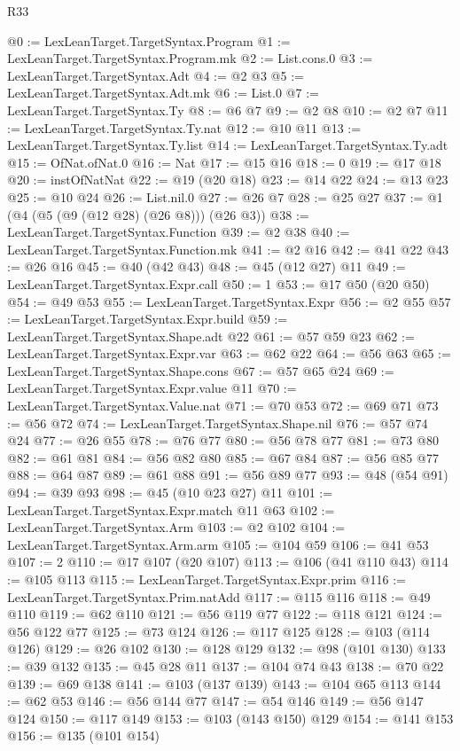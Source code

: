 \begin{lexlean}{R33}
\begin{coremodule}
@0 := LexLeanTarget.TargetSyntax.Program
@1 := LexLeanTarget.TargetSyntax.Program.mk
@2 := List.cons.{0}
@3 := LexLeanTarget.TargetSyntax.Adt
@4 := @2 @3
@5 := LexLeanTarget.TargetSyntax.Adt.mk
@6 := List.{0}
@7 := LexLeanTarget.TargetSyntax.Ty
@8 := @6 @7
@9 := @2 @8
@10 := @2 @7
@11 := LexLeanTarget.TargetSyntax.Ty.nat
@12 := @10 @11
@13 := LexLeanTarget.TargetSyntax.Ty.list
@14 := LexLeanTarget.TargetSyntax.Ty.adt
@15 := OfNat.ofNat.{0}
@16 := Nat
@17 := @15 @16
@18 := 0
@19 := @17 @18
@20 := instOfNatNat
@22 := @19 (@20 @18)
@23 := @14 @22
@24 := @13 @23
@25 := @10 @24
@26 := List.nil.{0}
@27 := @26 @7
@28 := @25 @27
@37 := @1 (@4 (@5 (@9 (@12 @28) (@26 @8))) (@26 @3))
@38 := LexLeanTarget.TargetSyntax.Function
@39 := @2 @38
@40 := LexLeanTarget.TargetSyntax.Function.mk
@41 := @2 @16
@42 := @41 @22
@43 := @26 @16
@45 := @40 (@42 @43)
@48 := @45 (@12 @27) @11
@49 := LexLeanTarget.TargetSyntax.Expr.call
@50 := 1
@53 := @17 @50 (@20 @50)
@54 := @49 @53
@55 := LexLeanTarget.TargetSyntax.Expr
@56 := @2 @55
@57 := LexLeanTarget.TargetSyntax.Expr.build
@59 := LexLeanTarget.TargetSyntax.Shape.adt @22
@61 := @57 @59 @23
@62 := LexLeanTarget.TargetSyntax.Expr.var
@63 := @62 @22
@64 := @56 @63
@65 := LexLeanTarget.TargetSyntax.Shape.cons
@67 := @57 @65 @24
@69 := LexLeanTarget.TargetSyntax.Expr.value @11
@70 := LexLeanTarget.TargetSyntax.Value.nat
@71 := @70 @53
@72 := @69 @71
@73 := @56 @72
@74 := LexLeanTarget.TargetSyntax.Shape.nil
@76 := @57 @74 @24
@77 := @26 @55
@78 := @76 @77
@80 := @56 @78 @77
@81 := @73 @80
@82 := @61 @81
@84 := @56 @82 @80
@85 := @67 @84
@87 := @56 @85 @77
@88 := @64 @87
@89 := @61 @88
@91 := @56 @89 @77
@93 := @48 (@54 @91)
@94 := @39 @93
@98 := @45 (@10 @23 @27) @11
@101 := LexLeanTarget.TargetSyntax.Expr.match @11 @63
@102 := LexLeanTarget.TargetSyntax.Arm
@103 := @2 @102
@104 := LexLeanTarget.TargetSyntax.Arm.arm
@105 := @104 @59
@106 := @41 @53
@107 := 2
@110 := @17 @107 (@20 @107)
@113 := @106 (@41 @110 @43)
@114 := @105 @113
@115 := LexLeanTarget.TargetSyntax.Expr.prim
@116 := LexLeanTarget.TargetSyntax.Prim.natAdd
@117 := @115 @116
@118 := @49 @110
@119 := @62 @110
@121 := @56 @119 @77
@122 := @118 @121
@124 := @56 @122 @77
@125 := @73 @124
@126 := @117 @125
@128 := @103 (@114 @126)
@129 := @26 @102
@130 := @128 @129
@132 := @98 (@101 @130)
@133 := @39 @132
@135 := @45 @28 @11
@137 := @104 @74 @43
@138 := @70 @22
@139 := @69 @138
@141 := @103 (@137 @139)
@143 := @104 @65 @113
@144 := @62 @53
@146 := @56 @144 @77
@147 := @54 @146
@149 := @56 @147 @124
@150 := @117 @149
@153 := @103 (@143 @150) @129
@154 := @141 @153
@156 := @135 (@101 @154)

\end{coremodule}
\end{lexlean}
